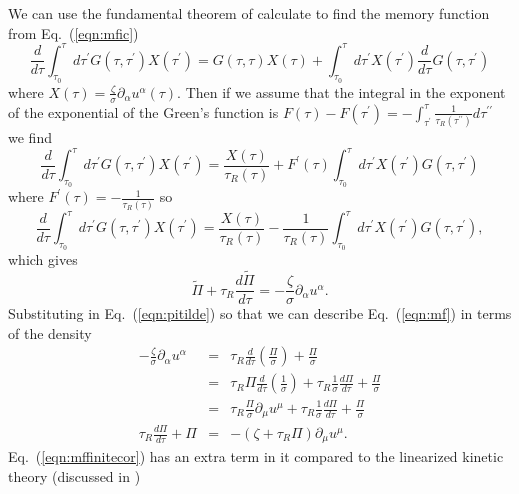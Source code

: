 \documentclass[aps,article]{revtex4}
\begin{document}
We can use the fundamental theorem of calculate to find the memory function from Eq.\ (\ref{eqn:mfic})
\begin{equation}
\frac{d}{d\tau}\int_{\tau_0}^{\tau}d\tau^{\prime}G\left(\tau,\tau^{\prime}\right)X(\tau^{\prime})=G\left(\tau,\tau\right)X(\tau)+\int_{\tau_0}^{\tau}d\tau^{\prime}X(\tau^{\prime})\frac{d}{d\tau}G\left(\tau,\tau^{\prime}\right)
\end{equation}
where $X\left(\tau\right)=\frac{\zeta}{\sigma}\partial_{\alpha}u^{\alpha}\left(\tau\right)$.  Then if we assume that the integral in the exponent of the exponential of the Green's function is $F(\tau)-F(\tau^{\prime})=-\int_{\tau^{\prime}}^{\tau}\frac{1}{\tau_R\left(\tau^{\prime\prime}\right)}d\tau^{\prime\prime}$ we find
\begin{equation}
\frac{d}{d\tau}\int_{\tau_0}^{\tau}d\tau^{\prime}G\left(\tau,\tau^{\prime}\right)X(\tau^{\prime})=\frac{X\left(\tau\right)}{\tau_R (\tau)}+F^{\prime}(\tau)\int_{\tau_0}^{\tau}d\tau^{\prime}X(\tau^{\prime})G\left(\tau,\tau^{\prime}\right)
\end{equation}
where $F^{\prime}(\tau)=-\frac{1}{\tau_R\left(\tau\right)}$ so
\begin{equation}
\frac{d}{d\tau}\int_{\tau_0}^{\tau}d\tau^{\prime}G\left(\tau,\tau^{\prime}\right)X(\tau^{\prime})=\frac{X\left(\tau\right)}{\tau_R (\tau)}-\frac{1}{\tau_R (\tau)}\int_{\tau_0}^{\tau}d\tau^{\prime}X(\tau^{\prime})G\left(\tau,\tau^{\prime}\right),
\end{equation}
which gives
\begin{equation}\label{eqn:mf}
\tilde{\Pi}+\tau_R\frac{d\tilde{\Pi}}{d\tau}=-\frac{\zeta}{\sigma}\partial_{\alpha}u^{\alpha}.
\end{equation}
Substituting in Eq.\ (\ref{eqn:pitilde}) so that we can describe Eq.\ (\ref{eqn:mf}) in terms of the density
\begin{eqnarray}
-\frac{\zeta}{\sigma}\partial_{\alpha}u^{\alpha}&=&\tau_R\frac{d}{d\tau}\left(\frac{\Pi}{\sigma}\right)+\frac{\Pi}{\sigma}\nonumber\\
&=&\tau_R\Pi\frac{d}{d\tau}\left(\frac{1}{\sigma}\right)+\tau_R\frac{1}{\sigma}\frac{d\Pi}{d\tau}+\frac{\Pi}{\sigma}\nonumber\\
&=&\tau_R\frac{\Pi}{\sigma}\partial_{\mu}u^{\mu}+\tau_R\frac{1}{\sigma}\frac{d\Pi}{d\tau}+\frac{\Pi}{\sigma}\nonumber\\
\tau_R\frac{d\Pi}{d\tau}+\Pi&=&-\left(\zeta+\tau_R\Pi\right)\partial_{\mu}u^{\mu}.\label{eqn:mffinitecor}
\end{eqnarray}
Eq.\ (\ref{eqn:mffinitecor}) has an extra term in it compared to the linearized kinetic theory (discussed in \cite{prc2007})
\end{document}
